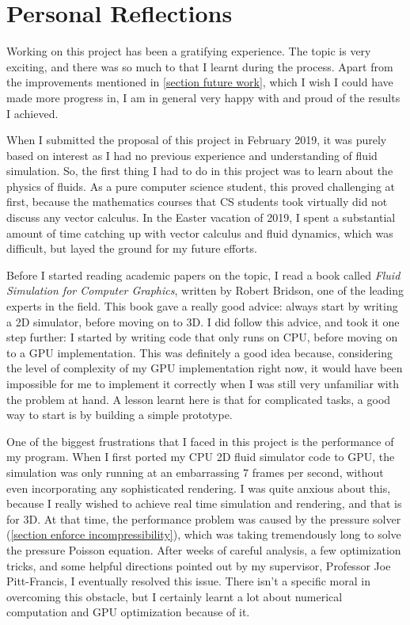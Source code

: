 \section{Personal Reflections}
Working on this project has been a gratifying experience. The topic is very exciting, and there was so much to that I learnt during the process. Apart from the improvements mentioned in \ref{section future work}, which I wish I could have made more progress in, I am in general very happy with and proud of the results I achieved.

When I submitted the proposal of this project in February 2019, it was purely based on interest as I had no previous experience and understanding of fluid simulation. So, the first thing I had to do in this project was to learn about the physics of fluids. As a pure computer science student, this proved challenging at first, because the mathematics courses that CS students took virtually did not discuss any vector calculus. In the Easter vacation of 2019, I spent a substantial amount of time catching up with vector calculus and fluid dynamics, which was difficult, but layed the ground for my future efforts.

Before I started reading academic papers on the topic, I read a book called \textit{Fluid Simulation for Computer Graphics}\cite{bridson2015fluid}, written by Robert Bridson, one of the leading experts in the field. This book gave a really good advice: always start by writing a 2D simulator, before moving on to 3D. I did follow this advice, and took it one step further: I started by writing code that only runs on CPU, before moving on to a GPU implementation. This was definitely a good idea because, considering the level of complexity of my GPU implementation right now, it would have been impossible for me to implement it correctly when I was still very unfamiliar with the problem at hand. A lesson learnt here is that for complicated tasks, a good way to start is by building a simple prototype.

One of the biggest frustrations that I faced in this project is the performance of my program. When I first ported my CPU 2D fluid simulator code to GPU, the simulation was only running at an embarrassing 7 frames per second, without even incorporating any sophisticated rendering. I was quite anxious about this, because I really wished to achieve real time simulation and rendering, and that is for 3D. At that time, the performance problem was caused by the pressure solver (\ref{section enforce incompressibility}), which was taking tremendously long to solve the pressure Poisson equation. After weeks of careful analysis, a few optimization tricks, and some helpful directions pointed out by my supervisor, Professor Joe Pitt-Francis, I eventually resolved this issue. There isn't a specific moral in overcoming this obstacle, but I certainly learnt a lot about numerical computation and GPU optimization because of it.

